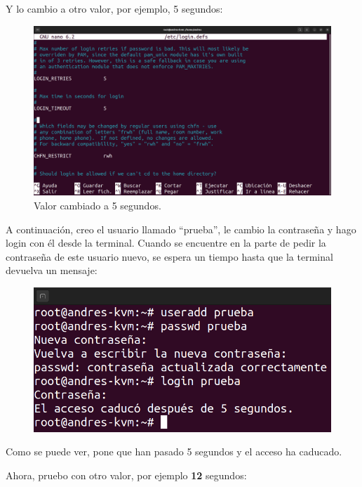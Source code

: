 \documentclass{article}
\begin{document}
Y lo cambio a otro valor, por ejemplo, 5 segundos:

\begin{figure}[H]
    \includegraphics[width=\textwidth]{imagenes/tout5.png}
    \caption{Valor cambiado a 5 segundos.}
\end{figure}

A continuación, creo el usuario llamado ``prueba'', le cambio la contraseña y hago login con él desde la terminal. Cuando se encuentre en la parte de pedir la contraseña de este usuario nuevo, se espera un tiempo hasta que la terminal devuelva un mensaje:

\begin{figure}[H]
    \includegraphics[width=\textwidth]{imagenes/tout5login.png}
\end{figure}

Como se puede ver, pone que han pasado 5 segundos y el acceso ha caducado.

Ahora, pruebo con otro valor, por ejemplo \textbf{12} segundos:
\end{document}
